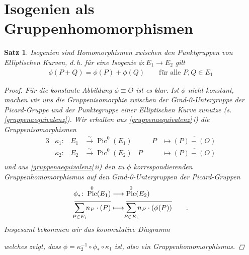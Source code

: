 \documentclass[english, german, parskip=half]{scrartcl}
\newtheorem{Satz}{Satz}[section]
\theoremstyle{definition}
\theoremstyle{remark}
\newcommand*{\longto}{\longrightarrow}
\DeclareMathOperator{\Pic}{Pic} %
\begin{document}

\section{Isogenien als Gruppenhomomorphismen}
\begin{Satz}\label{isogenienhoms}
  Isogenien sind Homomorphismen zwischen den Punktgruppen von
  Elliptischen Kurven, d.\,h. für eine Isogenie $\phi\colon E_1\to
  E_2$ gilt
  \begin{gather*}
    \phi(P+Q) = \phi(P) + \phi(Q)
    \qquad \text{für alle } P,Q\in E_1
  \end{gather*}
\begin{proof}
  Für die konstante Abbildung $\phi\equiv O$ ist es klar.
  Ist $\phi$ nicht konstant, machen wir uns die Gruppenisomorphie
  zwischen der Grad-0-Untergruppe der Picard-Gruppe und der
  Punktegruppe einer Elliptischen Kurve zunutze
  (s.\,\autoref{gruppenaequivalenz}).
  Wir erhalten 
  aus \autoref{gruppenaequivalenz}\,i) die Gruppenisomorphismen 
  \begin{alignat*}{3}
    &\kappa_1\colon&
    E_1&\overset\sim\longto \Pic^0(E_1)
    &\qquad P &\longmapsto \overline{(P)-(O)}\\
    &\kappa_2\colon&
    E_2&\overset\sim\longto \Pic^0(E_2)
    &P &\longmapsto \overline{(P)-(O)}\\
  \end{alignat*}
  und aus \autoref{gruppenaequivalenz}\,ii) den zu $\phi$
  korrespondierenden Gruppenhomomorphismus auf den Grad-0-Untergruppen
  der Picard-Gruppen
  \begin{align*}
    \phi_*\colon \Pic^0(E_1) 
    &\longto \Pic^0(E_2)\\
    \overline{\sum_{\mathclap{P\in E_1}}n_P\cdot(P)}
    &\longmapsto 
      \overline{\sum_{\mathclap{P\in E_1}}n_P\cdot(\phi(P))}
      \qquad .
  \end{align*}
  Insgesamt bekommen wir das kommutative Diagramm
  \begin{center}
  \end{center}
  welches zeigt, dass $\phi=\kappa_2^{-1}\circ\phi_*\circ\kappa_1$
  ist, also ein Gruppenhomomorphismus.
\end{proof}
\end{Satz}
\end{document}
